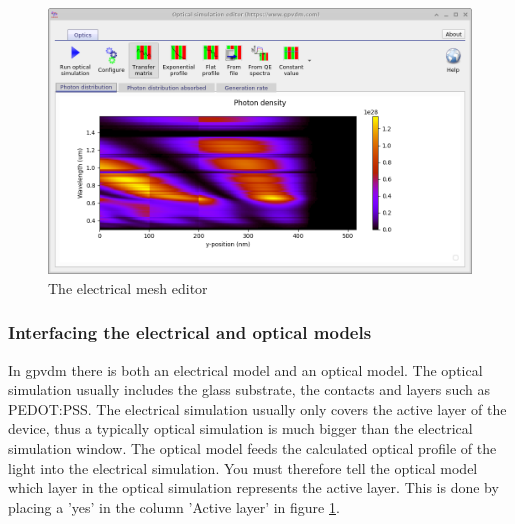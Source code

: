 \documentclass[11pt]{article}
\begin{document}
\begin{figure}[ht!]
\centering
\includegraphics[width=140mm]{./images/opticalsimulation.png}
\caption{The electrical mesh editor}
\label{fig:opticalsimulation}
\end{figure}

\subsubsection{Interfacing the electrical and optical models}
In gpvdm there is both an electrical model and an optical model.  The optical simulation usually includes the glass substrate, the contacts and layers such as PEDOT:PSS.  The electrical simulation usually only covers the active layer of the device, thus a typically optical simulation is much bigger than the electrical simulation window.  The optical model feeds the calculated optical profile of the light into the electrical simulation.  You must therefore tell the optical model which layer in the optical simulation represents the active layer.  This is done by placing a 'yes' in the column 'Active layer' in figure \ref{fig:opticalsimulation}.
\newpage
\vfill
\end{document}

